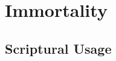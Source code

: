 \section{Immortality}
	\label{IMMORTALITY}
	





\subsection{Scriptural Usage} %
	\label{IMMORTALITY-SCRIPTURES}

	
	
